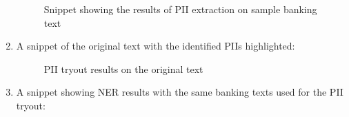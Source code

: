 \begin{enumerate}
\begin {figure}[h!h]
            \caption{Snippet showing the results of PII extraction on sample banking text}
            \label{piires}
        \end {figure}
    \newpage
    \item A snippet of the original text with the identified PIIs highlighted:
        \begin {figure}[h!h]
            \centering
            \caption{PII tryout results on the original text}
            \label{piiogtext}
        \end {figure}
    \item A snippet showing NER results with the same banking texts used for the PII tryout:
        \begin {figure}[h!h]
            \centering

\end{figure}
\end{enumerate}
